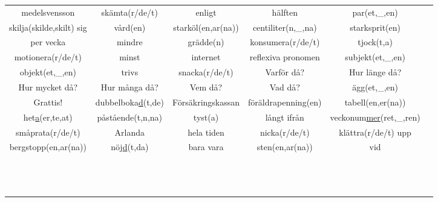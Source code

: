 
\begin{center}
    \begin{adjustwidth}{-2.4cm}{}
        \begin{tabular}{|c c c c c c|}
            \hline
            medelsvensson & skämta(r/de/t) & enligt & hälften & par(et,\_,en) &  \\
            skilja(skilde,skilt) sig & vård(en) & starköl(en,ar(na)) & centiliter(n,\_,na) & starksprit(en) &  \\
            per vecka & mindre & grädde(n) & konsumera(r/de/t) & tjock(t,a) &  \\
            motionera(r/de/t) & minst & internet & reflexiva pronomen & subjekt(et,\_,en) &  \\
            objekt(et,\_,en) & trivs & snacka(r/de/t) & Varför då? & Hur länge då? &  \\
            Hur mycket då? & Hur många då? & Vem då? & Vad då? & ägg(et,\_,en) &  \\
            Grattis! & dubbelboka\underline{d}(t,de) & Försäkringskassan & föräldrapenning(en) & tabell(en,er(na)) &  \\
            het\underline{a}(er,te,at) & påstående(t,n,na) & tyst(a) & långt ifrån & veckonum\underline{mer}(ret,\_,ren) &  \\
            småprata(r/de/t) & Arlanda & hela tiden & nicka(r/de/t) & klättra(r/de/t) upp &  \\
            bergstopp(en,ar(na)) & nöj\underline{d}(t,da) & bara vara & sten(en,ar(na)) & vid &  \\
             &  &  &  &  &  \\
             &  &  &  &  &  \\
             &  &  &  &  &  \\
             &  &  &  &  &  \\
             &  &  &  &  &  \\
             &  &  &  &  &  \\
             &  &  &  &  &  \\
             &  &  &  &  &  \\
             &  &  &  &  &  \\
             &  &  &  &  &  \\
             &  &  &  &  &  \\
             &  &  &  &  &  \\
             &  &  &  &  &  \\

\end{tabular}
\end{adjustwidth}
\end{center}
